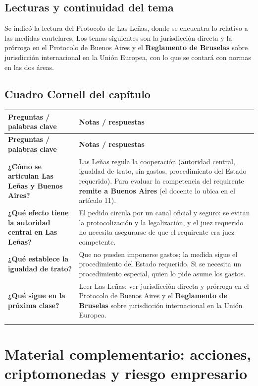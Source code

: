 \documentclass[12pt,oneside]{book}
\makeatletter
\newenvironment{cornell}{%
    \begin{longtable}{@{}>{\raggedright\arraybackslash}p{0.28\textwidth}>{\raggedright\arraybackslash}p{0.67\textwidth}@{}}
    \toprule
    \textbf{Preguntas / palabras clave} & \textbf{Notas / respuestas} \\
    \midrule
    \endfirsthead
    \toprule
    \textbf{Preguntas / palabras clave} & \textbf{Notas / respuestas} \\
    \midrule
    \endhead
}{%
    \end{longtable}
}
\newcommand{\cornellrow}[2]{\textbf{#1} & #2 \\[0.6em]}
\newcommand{\cornellresumen}[1]{%
    \midrule
    \multicolumn{2}{@{}p{\dimexpr0.95\textwidth+2\tabcolsep\relax}@{}}{\textbf{Resumen:} #1} \\
    \bottomrule
}
\makeatother
\begin{document}
\section{Lecturas y continuidad del tema}

Se indicó la lectura del Protocolo de Las Leñas, donde se encuentra lo relativo a las medidas cautelares. Los temas siguientes son la jurisdicción directa y la prórroga en el Protocolo de Buenos Aires y el \textbf{Reglamento de Bruselas} sobre jurisdicción internacional en la Unión Europea, con lo que se contará con normas en las dos áreas.

\section{Cuadro Cornell del capítulo}

\begin{cornell}
\cornellrow{¿Cómo se articulan Las Leñas y Buenos Aires?}{Las Leñas regula la cooperación (autoridad central, igualdad de trato, sin gastos, procedimiento del Estado requerido). Para evaluar la competencia del requirente \textbf{remite a Buenos Aires} (el docente lo ubica en el artículo 11).}
\cornellrow{¿Qué efecto tiene la autoridad central en Las Leñas?}{El pedido circula por un canal oficial y seguro: se evitan la protocolización y la legalización, y el juez requerido no necesita asegurarse de que el requirente era juez competente.}
\cornellrow{¿Qué establece la igualdad de trato?}{Que no pueden imponerse gastos; la medida sigue el procedimiento del Estado requerido. Si se necesita un procedimiento especial, quien lo pide asume los gastos.}
\cornellrow{¿Qué sigue en la próxima clase?}{Leer Las Leñas; ver jurisdicción directa y prórroga en el Protocolo de Buenos Aires y el \textbf{Reglamento de Bruselas} sobre jurisdicción internacional en la Unión Europea.}
\cornellresumen{El Protocolo de Buenos Aires regula los tres aspectos de la jurisdicción contractual y remite al Protocolo de Las Leñas para la cooperación. Las Leñas organiza el trámite mediante la autoridad central, la igualdad de trato y el procedimiento del Estado requerido, y para controlar la competencia del requirente remite a los criterios de Buenos Aires.}
\end{cornell}

\chapter[Material complementario: riesgo empresario y valor]{Material complementario: acciones, criptomonedas y riesgo empresario}
\end{document}
